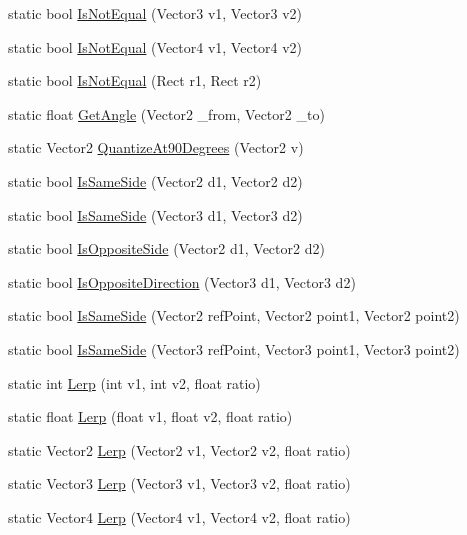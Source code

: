\begin{DoxyCompactItemize}
\item 
static bool \hyperlink{class_math3_d_a0d74cfaa9152ddc57d848f302884fe11}{Is\+Not\+Equal} (Vector3 v1, Vector3 v2)
\item 
static bool \hyperlink{class_math3_d_a0b843cbf417cc374263489822bb93dc5}{Is\+Not\+Equal} (Vector4 v1, Vector4 v2)
\item 
static bool \hyperlink{class_math3_d_a2eabbb419bfcf1ef79388ed25fa21276}{Is\+Not\+Equal} (Rect r1, Rect r2)
\item 
static float \hyperlink{class_math3_d_a3dfb05705451548962ac0aaaf641c384}{Get\+Angle} (Vector2 \+\_\+from, Vector2 \+\_\+to)
\item 
static Vector2 \hyperlink{class_math3_d_ab64b0be94a329b186ddd0746e6fd454a}{Quantize\+At90\+Degrees} (Vector2 v)
\item 
static bool \hyperlink{class_math3_d_a720baac75bb84c651ceb697327b12ea9}{Is\+Same\+Side} (Vector2 d1, Vector2 d2)
\item 
static bool \hyperlink{class_math3_d_ad23c1aa4edcfcd4a78fd2ccc92539b9e}{Is\+Same\+Side} (Vector3 d1, Vector3 d2)
\item 
static bool \hyperlink{class_math3_d_a9833acad7419cb17770d056473f85c5f}{Is\+Opposite\+Side} (Vector2 d1, Vector2 d2)
\item 
static bool \hyperlink{class_math3_d_a87138dfdb92174e2e165ccb0c99a097f}{Is\+Opposite\+Direction} (Vector3 d1, Vector3 d2)
\item 
static bool \hyperlink{class_math3_d_aae497c771078e11e2d525089106d68b0}{Is\+Same\+Side} (Vector2 ref\+Point, Vector2 point1, Vector2 point2)
\item 
static bool \hyperlink{class_math3_d_a22e9ce06d3bc5847ff6528867817adee}{Is\+Same\+Side} (Vector3 ref\+Point, Vector3 point1, Vector3 point2)
\item 
static int \hyperlink{class_math3_d_add1b777a48937d3830d5fd93c2678412}{Lerp} (int v1, int v2, float ratio)
\item 
static float \hyperlink{class_math3_d_ac47c27ec3f52cce1a6d19577e33b1cab}{Lerp} (float v1, float v2, float ratio)
\item 
static Vector2 \hyperlink{class_math3_d_a438157ceaee8965a5c0afa398bb8d2ac}{Lerp} (Vector2 v1, Vector2 v2, float ratio)
\item 
static Vector3 \hyperlink{class_math3_d_aa2b20924ea562550fb4f411b4ca97f82}{Lerp} (Vector3 v1, Vector3 v2, float ratio)
\item 
static Vector4 \hyperlink{class_math3_d_ace240347ccaade5f9ffe2eb465d45241}{Lerp} (Vector4 v1, Vector4 v2, float ratio)

\end{DoxyCompactItemize}
